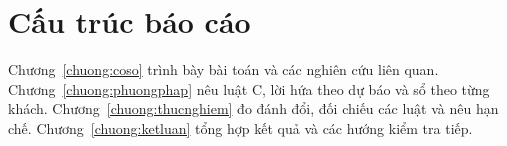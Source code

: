 \section{Cấu trúc báo cáo}
\label{muc:c1-cautruc}

Chương~\ref{chuong:coso} trình bày bài toán và các nghiên cứu liên quan.
Chương~\ref{chuong:phuongphap} nêu luật C, lời hứa theo dự báo và sổ theo từng khách.
Chương~\ref{chuong:thucnghiem} đo đánh đổi, đối chiếu các luật và nêu hạn chế.
Chương~\ref{chuong:ketluan} tổng hợp kết quả và các hướng kiểm tra tiếp.
